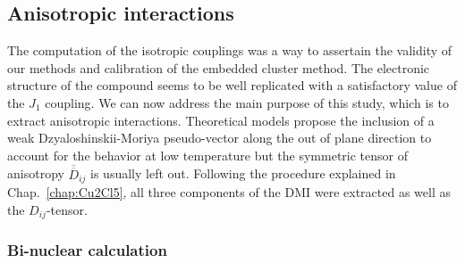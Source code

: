 \documentclass[12pt,a4paper]{report}
\numberwithin{equation}{section}
\begin{document}
\subsection{Anisotropic interactions}

The computation of the isotropic couplings was a way to assertain the validity of our methods and calibration of the embedded cluster method.
The electronic structure of the compound seems to be well replicated with a satisfactory value of the $J_1$ coupling.
We can now address the main purpose of this study, which is to extract anisotropic interactions.
Theoretical models propose the inclusion of a weak Dzyaloshinskii-Moriya pseudo-vector along the out of plane direction to account for the behavior at low temperature but the symmetric tensor of anisotropy $\overline{\overline{D}}_{ij}$ is usually left out.
Following the procedure explained in Chap.~\ref{chap:Cu2Cl5}, all three components of the DMI were extracted as well as the $D_{ij}$-tensor.


\subsubsection*{Bi-nuclear calculation}
\end{document}
